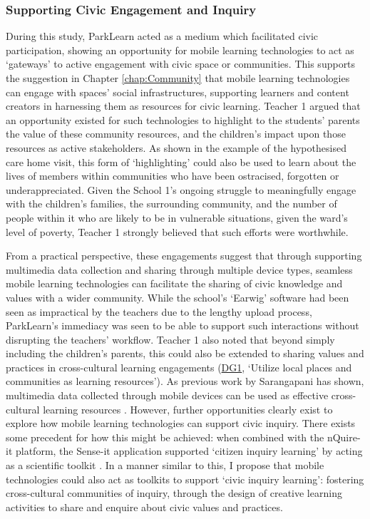 \subsubsection{Supporting Civic Engagement and Inquiry}

During this study, ParkLearn acted as a medium which facilitated civic participation, showing an opportunity for mobile learning technologies to act as `gateways' to active engagement with civic space or communities. This supports the suggestion in Chapter \ref{chap:Community} that mobile learning technologies can engage with spaces’ social infrastructures, supporting learners and content creators in harnessing them as resources for civic learning. Teacher 1 argued that an opportunity existed for such technologies to highlight to the students' parents the value of these community resources, and the children’s impact upon those resources as active stakeholders. As shown in the example of the hypothesised care home visit, this form of `highlighting' could also be used to learn about the lives of members within communities who have been ostracised, forgotten or underappreciated. Given the School 1's ongoing struggle to meaningfully engage with the children's families, the surrounding community, and the number of people within it who are likely to be in vulnerable situations, given the ward's level of poverty, Teacher 1 strongly believed that such efforts were worthwhile.

From a practical perspective, these engagements suggest that through supporting multimedia data collection and sharing through multiple device types, seamless mobile learning technologies can facilitate the sharing of civic knowledge and values with a wider community. While the school's ‘Earwig’ software had been seen as impractical by the teachers due to the lengthy upload process, ParkLearn’s immediacy was seen to be able to support such interactions without disrupting the teachers’ workflow. Teacher 1 also noted that beyond simply including the children’s parents, this could also be extended to sharing values and practices in cross-cultural learning engagements (\hyperref[DG1]{DG1}, `Utilize local places and communities as learning resources'). As previous work by Sarangapani has shown, multimedia data collected through mobile devices can be used as effective cross-cultural learning resources \citep{Sarangapani2016}. However, further opportunities clearly exist to explore how mobile learning technologies can support civic inquiry. There exists some precedent for how this might be achieved: when combined with the nQuire-it platform, the Sense-it application supported ‘citizen inquiry learning’ by acting as a scientific toolkit \citep{Sharples2017}. In a manner similar to this, I propose that mobile technologies could also act as toolkits to support ‘civic inquiry learning’: fostering cross-cultural communities of inquiry, through the design of creative learning activities to share and enquire about civic values and practices.

